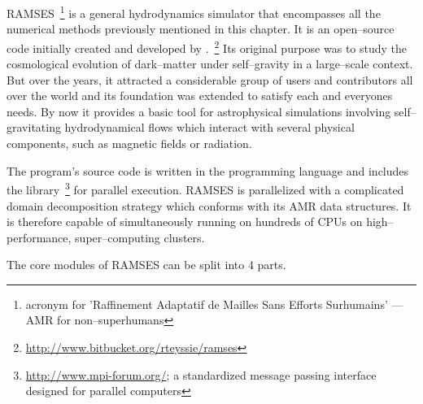 RAMSES~\footnote{acronym for 'Raffinement Adaptatif de Mailles Sans Efforts Surhumains' --- AMR for non--superhumans} is a general hydrodynamics simulator that encompasses all the numerical methods previously mentioned in this chapter.
It is an open--source code initially created and developed by \citet{Romain_RAMSES}.~\footnote{\url{http://www.bitbucket.org/rteyssie/ramses}}
Its original purpose was to study the cosmological evolution of dark--matter under self--gravity in a large--scale context.
But over the years, it attracted a considerable group of users and contributors all over the world and its foundation was extended to satisfy each and everyones needs.
By now it provides a basic tool for astrophysical simulations involving self--gravitating hydrodynamical flows which interact with several physical components, such as magnetic fields or radiation.

The program's source code is written in the programming language  and includes the  library~\footnote{\url{http://www.mpi-forum.org/}; a standardized message passing interface designed for parallel computers} for parallel execution.
RAMSES is parallelized with a complicated domain decomposition strategy which conforms with its AMR data structures.
It is therefore capable of simultaneously running on hundreds of CPUs on high--performance, super--computing clusters.

The core modules of RAMSES can be split into 4 parts.

